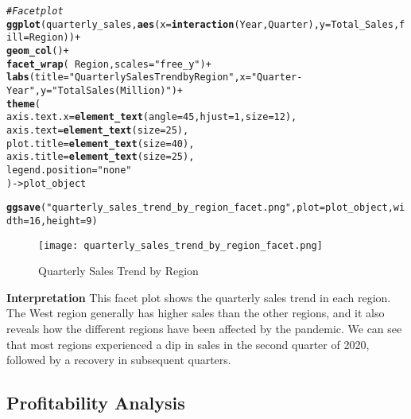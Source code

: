 \documentclass{article}\usepackage[]{graphicx}\usepackage[]{xcolor}
\makeatletter
\newcommand{\hlnum}[1]{\textcolor[rgb]{0.686,0.059,0.569}{#1}}%
\newcommand{\hlsng}[1]{\textcolor[rgb]{0.192,0.494,0.8}{#1}}%
\newcommand{\hlcom}[1]{\textcolor[rgb]{0.678,0.584,0.686}{\textit{#1}}}%
\newcommand{\hlopt}[1]{\textcolor[rgb]{0,0,0}{#1}}%
\newcommand{\hldef}[1]{\textcolor[rgb]{0.345,0.345,0.345}{#1}}%
\newcommand{\hlkwb}[1]{\textcolor[rgb]{0.69,0.353,0.396}{#1}}%
\newcommand{\hlkwc}[1]{\textcolor[rgb]{0.333,0.667,0.333}{#1}}%
\newcommand{\hlkwd}[1]{\textcolor[rgb]{0.737,0.353,0.396}{\textbf{#1}}}%
\newenvironment{kframe}{%
 \def\at@end@of@kframe{}%
 \ifinner\ifhmode%
  \def\at@end@of@kframe{\end{minipage}}%
  \begin{minipage}{\columnwidth}%
 \fi\fi%
 \def\FrameCommand##1{\hskip\@totalleftmargin \hskip-\fboxsep
 \colorbox{shadecolor}{##1}\hskip-\fboxsep
     \hskip-\linewidth \hskip-\@totalleftmargin \hskip\columnwidth}%
 \MakeFramed {\advance\hsize-\width
   \@totalleftmargin\z@ \linewidth\hsize
   \@setminipage}}%
 {\par\unskip\endMakeFramed%
 \at@end@of@kframe}
\newenvironment{knitrout}{}{} %
\makeatother
\begin{document}
\begin{knitrout}
\begin{kframe}
\begin{alltt}
\hlcom{# Facet plot}
\hlkwd{ggplot}\hldef{(quarterly_sales,} \hlkwd{aes}\hldef{(}\hlkwc{x} \hldef{=} \hlkwd{interaction}\hldef{(Year, Quarter),} \hlkwc{y} \hldef{= Total_Sales,} \hlkwc{fill} \hldef{= Region))} \hlopt{+}
  \hlkwd{geom_col}\hldef{()} \hlopt{+}
  \hlkwd{facet_wrap}\hldef{(}\hlopt{~}\hldef{Region,} \hlkwc{scales} \hldef{=} \hlsng{"free_y"}\hldef{)} \hlopt{+}
  \hlkwd{labs}\hldef{(}\hlkwc{title} \hldef{=} \hlsng{"Quarterly Sales Trend by Region"}\hldef{,} \hlkwc{x} \hldef{=} \hlsng{"Quarter-Year"}\hldef{,} \hlkwc{y} \hldef{=} \hlsng{"Total Sales (Million)"}\hldef{)} \hlopt{+}
  \hlkwd{theme}\hldef{(}
    \hlkwc{axis.text.x} \hldef{=} \hlkwd{element_text}\hldef{(}\hlkwc{angle} \hldef{=} \hlnum{45}\hldef{,} \hlkwc{hjust} \hldef{=} \hlnum{1}\hldef{,} \hlkwc{size} \hldef{=} \hlnum{12}\hldef{),}
    \hlkwc{axis.text} \hldef{=} \hlkwd{element_text}\hldef{(}\hlkwc{size} \hldef{=} \hlnum{25}\hldef{),}
    \hlkwc{plot.title} \hldef{=} \hlkwd{element_text}\hldef{(}\hlkwc{size} \hldef{=} \hlnum{40}\hldef{),}
    \hlkwc{axis.title} \hldef{=} \hlkwd{element_text}\hldef{(}\hlkwc{size} \hldef{=} \hlnum{25}\hldef{),}
    \hlkwc{legend.position} \hldef{=} \hlsng{"none"}
  \hldef{)} \hlkwb{->} \hldef{plot_object}

\hlkwd{ggsave}\hldef{(}\hlsng{"quarterly_sales_trend_by_region_facet.png"}\hldef{,} \hlkwc{plot} \hldef{= plot_object,} \hlkwc{width} \hldef{=} \hlnum{16}\hldef{,} \hlkwc{height} \hldef{=} \hlnum{9}\hldef{)}
\end{alltt}
\end{kframe}
\end{knitrout}

\begin{figure}[htbp]
\centering
\texttt{[image: quarterly\_sales\_trend\_by\_region\_facet.png]}
\caption{Quarterly Sales Trend by Region}
\label{fig:quarterly_sales_trend_by_region_facet}
\end{figure}

\text 


\textbf{Interpretation} This facet plot shows the quarterly sales trend in each region. The West region generally has higher sales than the other regions, and it also reveals how the different regions have been affected by the pandemic. We can see that most regions experienced a dip in sales in the second quarter of 2020, followed by a recovery in subsequent quarters.


\newpage

\subsection{Profitability Analysis}
\end{document}
